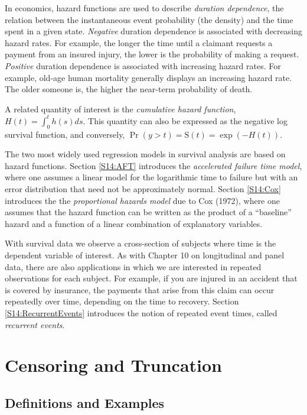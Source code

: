 In economics, hazard functions are used to describe \textit{duration
dependence}, the relation between the instantaneous event
probability (the density) and the time spent in a given state.
\textit{Negative} duration dependence is associated with decreasing
hazard rates. For example, the longer the time until a claimant
requests a payment from an insured injury, the lower is the
probability of making a request. \textit{Positive} duration
dependence is associated with increasing hazard rates. For example,
old-age human mortality generally displays an increasing hazard
rate. The older someone is, the higher the near-term probability of
death.

A related quantity of interest is the \emph{cumulative hazard
function}, $H(t)= \int_0^t h(s)ds$. This quantity can also be
expressed as the negative log survival function, and conversely,
$\Pr(y>t)=\mathrm{S}(t) = \exp (-H(t))$.

The two most widely used regression models in survival analysis are
based on hazard functions. Section \ref{S14:AFT} introduces the
\emph{accelerated failure time model}, where one assumes a linear
model for the logarithmic time to failure but with an error
distribution that need not be approximately normal. Section
\ref{S14:Cox} introduces the the \emph{proportional hazards model}
due to Cox (1972), where one assumes that the hazard function can be
written as the product of a ``baseline'' hazard and a function of a
linear combination of explanatory variables.

With survival data we observe a cross-section of subjects where time
is the dependent variable of interest. As with Chapter 10 on
longitudinal and panel data, there are also applications in which we
are interested in repeated observations for each subject. For
example, if you are injured in an accident that is covered by
insurance, the payments that arise from this claim can occur
repeatedly over time, depending on the time to recovery. Section
\ref{S14:RecurrentEvents} introduces the notion of repeated event
times, called \emph{recurrent events}.



\section{Censoring and Truncation}\label{S14:CensoringTruncation}

\subsection{Definitions and Examples}

